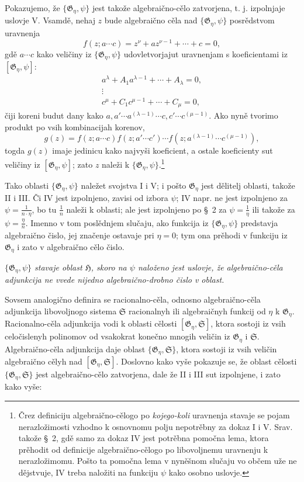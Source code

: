 \documentclass[11pt]{article}
\newlength{\sectionfourpageextra}
\begin{document}
Pokazujemo, že $\{\mathfrak G_\eta,\psi\}$ jest takože algebraično-cělo
zatvorjena, t. j. izpolnjaje uslovje V. Vsamdě, nehaj $z$ bude algebraično
cěla nad $\{\mathfrak G_\eta,\psi\}$ posrědstvom uravnenja
\enlargethispage{\sectionfourpageextra}
\[
 f(z;a\cdots c)=z^\nu+a z^{\nu-1}+\cdots+c=0,
\]
gdě $a\cdots c$ kako veličiny iz $\{\mathfrak G_\eta,\psi\}$ udovletvorjajut
uravnenjam s koeficientami iz $[\mathfrak G_\eta,\psi]$:
\[
\begin{gathered}
 a^\lambda+A_1a^{\lambda-1}+\cdots+A_\lambda=0,\\
 \vdots\\
 c^\mu+C_1c^{\mu-1}+\cdots+C_\mu=0,
\end{gathered}
\]
čiji koreni budut dany kako
$a,a'\cdots a^{(\lambda-1)}\cdots c,c'\cdots c^{(\mu-1)}$. Ako nyně tvorimo
produkt po vsih kombinacijah korenov,
\[
 g(z)=f(z;a\cdots c)f(z;a'\cdots c')\cdots
      f(z;a^{(\lambda-1)}\cdots c^{(\mu-1)}),
\]
togda $g(z)$ imaje jedinicu kako najvyši koeficient, a ostale koeficienty sut
veličiny iz $[\mathfrak G_\eta,\psi]$; zato $z$ naleži k
$\{\mathfrak G_\eta,\psi\}$.\footnote{Črez definiciju algebraično-cělogo po
{\itshape kojego-koli} uravnenja stavaje se pojam nerazložimosti vzhodno k
osnovnomu polju nepotrěbny za dokaz I i V. Srav. takože \S\ 2, gdě samo za
dokaz IV jest potrěbna pomočna lema, ktora prěhodit od definicije
algebraično-cělogo po libovoljnemu uravnenju k nerazložimomu. Pošto ta pomočna
lema v nyněšnom slučaju vo občem uže ne dějstvuje, IV treba naložiti na
funkciju $\psi$ kako osobno uslovje.}

Tako oblasti $\{\mathfrak G_\eta,\psi\}$ naležet svojstva I i V; i pošto
$\mathfrak G_\eta$ jest dělitelj oblasti, takože II i III. Či IV jest
izpolnjeno, zavisi od izbora $\psi$; IV napr. ne jest izpolnjeno za
$\psi=\frac{1}{n\cdot\eta}$, bo tu $\frac1n$ naleži k oblasti; ale jest
izpolnjeno po \S\ 2 za $\psi=\frac1\eta$ ili takože za $\psi=\frac{\eta}{n}$.
Imenno v tom poslědnjem slučaju, ako funkcija iz $\{\mathfrak G_\eta,\psi\}$
predstavja algebraično čislo, jej značenje ostavaje pri $\eta=0$; tym ona
prěhodi v funkciju iz $\mathfrak G_\eta$ i zato v algebraično cělo čislo.

{\itshape $\{\mathfrak G_\eta,\psi\}$ stavaje oblast $\mathfrak H$, skoro na
$\psi$ naloženo jest uslovje, že algebraično-cěla adjunkcija ne vvede nijedno
algebraično-drobno čislo v oblast.}

Sovsem analogično definira se racionalno-cěla, odnosno algebraično-cěla
adjunkcija libovoljnogo sistema $\mathfrak S$ racionalnyh ili algebraičnyh
funkcij od $\eta$ k $\mathfrak G_\eta$. Racionalno-cěla adjunkcija vodi k
oblasti cělosti $[\mathfrak G_\eta,\mathfrak S]$, ktora sostoji iz vsih
celočislenyh polinomov od vsakokrat konečno mnogih veličin iz
$\mathfrak G_\eta$ i $\mathfrak S$. Algebraično-cěla adjunkcija daje oblast
$\{\mathfrak G_\eta,\mathfrak S\}$, ktora sostoji iz vsih veličin algebraično
cělyh nad $[\mathfrak G_\eta,\mathfrak S]$. Doslovno kako vyše pokazuje se, že
oblast cělosti $\{\mathfrak G_\eta,\mathfrak S\}$ jest algebraično-cělo
zatvorjena, dale že II i III sut izpolnjene, i zato kako vyše:
\end{document}
